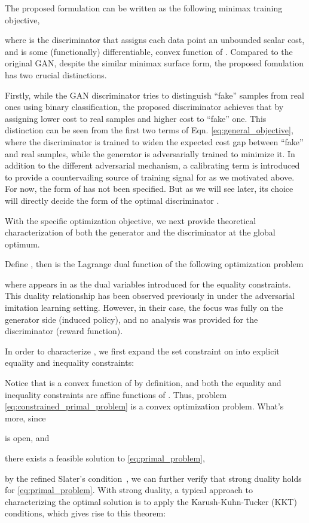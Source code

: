 \documentclass[a4paper]{article}
\begin{document}
The proposed formulation can be written as the following minimax training objective, 

where  is the discriminator that assigns each data point an unbounded scalar cost, and  is some (functionally) differentiable, convex function of .
Compared to the original GAN, despite the similar minimax surface form, the proposed fomulation has two crucial distinctions. 

Firstly, while the GAN discriminator tries to distinguish ``fake'' samples from real ones using binary classification, the proposed discriminator achieves that by assigning lower cost to real samples and higher cost to ``fake'' one.
This distinction can be seen from the first two terms of Eqn. \eqref{eq:general_objective}, where the discriminator  is trained to widen the expected cost gap between ``fake'' and real samples, while
the generator is adversarially trained to minimize it. In addition to the different adversarial mechanism, a calibrating term  is introduced to provide a countervailing source of training signal for  as we motivated above.
For now, the form of  has not been specified. But as we will see later, its choice will directly decide the form of the optimal discriminator .





With the specific optimization objective, we next provide theoretical characterization of both the generator and the discriminator at the global optimum. 

Define , then  is the Lagrange dual function of the following optimization problem

where  appears in  as the dual variables introduced for the equality constraints.
This duality relationship has been observed previously in \citep[equation (7)]{ho2016generative} under the adversarial imitation learning setting.
However, in their case, the focus was fully on the generator side (induced policy), and no analysis was provided for the discriminator (reward function).

In order to characterize , we first expand the set constraint on  into explicit equality and inequality constraints:


Notice that  is a convex function of  by definition, and both the equality and inequality constraints are affine functions of .
Thus, problem \eqref{eq:constrained_primal_problem} is a convex optimization problem.
What's more, since 
\begin{inlinelist}
\item  is open, and
\item there exists a feasible solution  to \eqref{eq:primal_problem},
\end{inlinelist}
by the refined Slater's condition~\citep[page~226]{boyd2004convex}, 
we can further verify that strong duality holds for \eqref{eq:primal_problem}.
With strong duality, a typical approach to characterizing the optimal solution is to apply the Karush-Kuhn-Tucker (KKT) conditions, which gives rise to this theorem:
\end{document}
